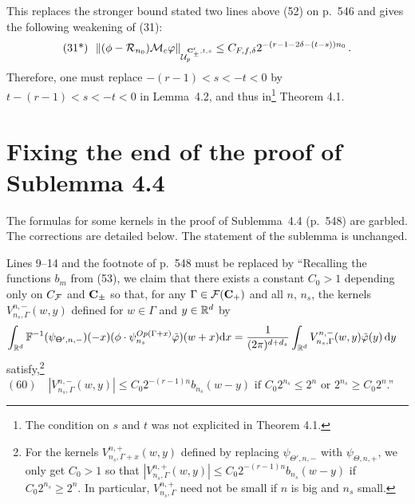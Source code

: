 \documentclass[10pt,twoside]{amsart}
\begin{document}
This replaces the stronger bound  stated two lines above (52) on p.~546 and gives
the following weakening of (31):
\begin{equation*}
\mbox{(31*)} \, \, \, \,  \|  (\phi - \mathcal {R}_{n_0}) \mathcal{M}_c \varphi \|_{\mathcal{U}_p^{\mathbf{C}'_\pm,t,s}}
\le  C_{F,f,\delta} 2^{-(r-1-2\delta-(t-s))n_0} \, .
\end{equation*} 
Therefore, one must replace
$-(r-1)<s<-t<0$ by  $t-(r-1)<s<-t<0$ in Lemma~4.2,
and thus in\footnote{The condition on $s$ and $t$ was not explicited in Theorem 4.1.} Theorem 4.1. 

\iffalse
Probably cannot be improved since the following argument gives the same factor:
To avoid this issue, one can replace the Besov space $B^s_p(\real^{d_s})$
by the Sobolev space $H^s_p(\real^{d_s})$ and use that, by duality, 
$\|\int_{\real^d} V_{n,\sigma}^{\ell,\tau}(x,y)\varphi(y) \mathrm{d} y\|_{H^s_p}$ coincides with
$$ \sup_{\|h \|_{ H^{|s|}_{p/(p-1)}}\le 1} 
\int_{\real^{d_s}} h(\pi_\Gamma^{-1} x) \int _{\real^d} V_{n,\sigma}^{\ell,\tau}(\pi_\Gamma^{-1}(x),y)\varphi(y) \mathrm{d} y \mathrm{d} x\, .
$$
Integrating  by parts $|s|$ times, first $V_{n,\sigma}^{\ell,\tau}(x,y)$ w.r. to $x$, giving $C 2^{ns}$,
and  then $\varphi$ w.r. to $y$ giving $C 2^{|s| \ell}$,
one should get $2^{|s|(\ell-n)} 2^{-(r-1)\max\{n,\ell\}}\le 2^{-(r-1+s)n}$, which is not better than (31*).
\fi


\section{Fixing the end of the proof of Sublemma 4.4}\label{five}

The formulas for some kernels in the proof
of Sublemma~4.4 (p.~548) are garbled. The corrections are detailed below.
The statement of the sublemma is unchanged.



Lines 9--14 and the footnote of p.~548  must be replaced by
``Recalling the  functions $b_m$ from (53), we claim that
 there exists a constant $C_0 >1$ depending only
on $C_{\mathcal{F}}$ and $\mathbf{C}_\pm$ 
so that, for any $\Gamma\in \mathcal{F}(\mathbf{C}_+)$ and all
$n$, $n_s$, the 
kernels $V^{n,-}_{n_s, \Gamma}(w,y)$ defined
for  $w \in \Gamma$ and $y\in \mathbb{R}^d$  by
\begin{align*}
\nonumber 
\int_{\mathbb{R}^d}  \mathbb{F}^{-1}(\psi_{\Theta',n,-})(-x)&(\phi \cdot \psi^{Op(\Gamma+x)}_{n_s} \tilde \varphi)(w+x)\mathrm {d} x
= \frac{1}{(2\pi)^{d+d_s}}\int_{\mathbb{R}^{d}} V^{n,-}_{n_s, \Gamma}(w,y)
\tilde \varphi(y) \, \mathrm {d} y
\end{align*}
satisfy,\footnote[21]{For the kernels $V^{n,+}_{n_s, \Gamma+x}(w,y)$ defined by replacing
$\psi_{\Theta',n,-}$ with $\psi_{\Theta,n,+}$, we only get $C_0>1$ so that
$| V^{n,+}_{n_s, \Gamma}(w,y) |\le C_0 2^{-(r-1)n}b_{n_s}(w-y)$ if  $C_0 2^{n_s} \ge  2^n$. In particular,  $V^{n,+}_{n_s, \Gamma}$ 
need not be small  if $n$ is big and  $n_s$ small.} 
$(60)\quad
|  V^{n,-}_{n_s, \Gamma}(w,y)  |
\le C_0 2^{-(r-1)n} b_{n_s}(w-y)
\mbox{ if }   C_0 2^{n_s} \le   2^n
\mbox{ or }   2^{n_s} \ge  C_0 2^n$.''
\end{document}

